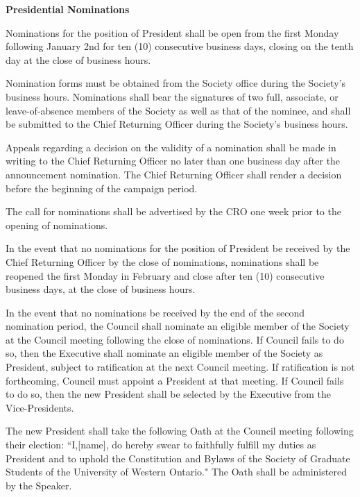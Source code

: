 \begin{longenum}[ label*=\thesection.\arabic*., align=left]
\begin{longenum}[label*=\arabic*., align=left]
 \end{longenum}
 \item \textbf{Presidential Nominations}
 \begin{longenum}[label*=\arabic*., align=left]
  \item  Nominations for the position of President shall be open from the first Monday following January 2nd for ten (10) consecutive business days, closing on the tenth day at the close of business hours. 
  \item  Nomination forms must be obtained from the Society office during the Society's business hours. Nominations shall bear the signatures of two full, associate, or leave-of-absence members of the Society as well as that of  the nominee, and shall be submitted to the Chief Returning Officer during the Society's business hours.
  \item Appeals regarding a decision on the validity of a nomination shall be made in writing to the Chief Returning Officer no later than one business day after the announcement nomination. The Chief Returning Officer shall render a decision before the beginning of the campaign period.
  \item The call for nominations shall be advertised by the CRO one week prior to the opening of nominations.
  \item In the event that no nominations for the position of President be received by the Chief Returning Officer by the close of nominations, nominations shall be reopened the first Monday in February and close after ten (10) consecutive business days, at the close of business hours.
  \item In the event that no nominations be received by the end of the second nomination period, the Council shall nominate an eligible member of the Society at the Council meeting following the close of nominations. If Council fails to do so, then the Executive shall nominate an eligible member of the Society as President, subject to ratification at the next Council meeting. If ratification is not forthcoming, Council must appoint a President at that meeting. If Council fails to do so, then the new President shall be selected by the Executive from the Vice-Presidents.
  \item The new President shall take the following Oath at the Council meeting following their election: ``I,[name], do hereby swear to faithfully fulfill my duties as President and to uphold the Constitution and Bylaws of the Society of Graduate Students of the University of Western Ontario." The Oath shall be administered by the Speaker.

\end{longenum}
\end{longenum}

